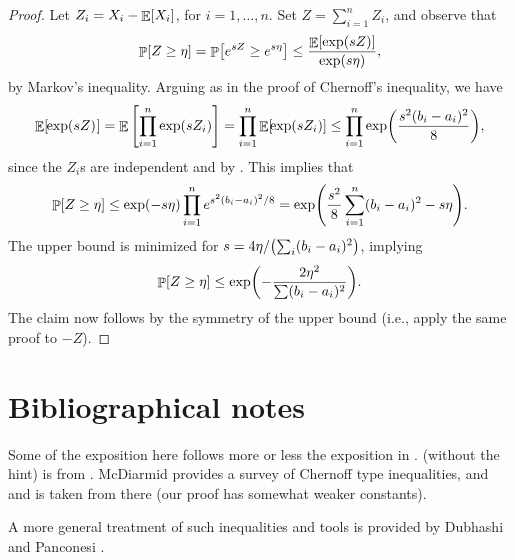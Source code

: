\begin{proof}
    Let $Z_{i}=X_{i}-\mathop{\mathbb{E}}\!\left[ {X_{i}} \right]$, for $i=1,\ldots, n$.  Set
    $Z = \sum_{i=1}^{n}Z_{i}$, and observe that
    \begin{align*}
        \Prob{ Z \geq \eta \MakesBig }  %
        =%
        \Prob{e^{sZ} \geq e^{s \eta}}
        \leq  \frac{\Ex{\exp\pth{sZ}}}{\exp(s\eta)},
    \end{align*}
    by Markov's inequality. Arguing as in the proof of Chernoff's
    inequality, we have
    \[
    \Ex{\MakeSBig\! \ts \exp\pth{sZ}\ts } = \Ex[]{ \prod_{i=1}^{n}
       \exp\pth{sZ_i}}%
    =%
    \prod_{i=1}^{n} \Ex{ \MakesBig\! \exp\pth{sZ_i}} \leq
    \prod_{i=1}^{n} \exp \pth{ \frac{s^{2}(b_{i}-a_{i})^{2}}{8}},
    \]
    since the $Z_i$s are independent and by
    . This implies that
    \begin{align*}
        \Prob{ Z \geq \eta \MakesBig } %
        \leq%
        \exp(-s\eta) \prod_{i=1}^{n} e^{s^{2}(b_{i}-a_{i})^{2}/8} %
        =%
        \exp\pth{ \frac{s^{2}}{8}\sum_{i=1}^{n}(b_{i}-a_{i})^{2} -
           s\eta }.
    \end{align*}
    The upper bound is minimized for $s = 4\eta/\pth{\sum_i
       (b_{i}-a_{i})^{2}}$, implying
    \[
    \Prob{ Z \geq \eta \MakesBig }%
    \leq%
    \exp \pth{-\frac{2\eta^{2}}{\sum (b_{i}-a_{i})^{2}}}.
    \]
    The claim now follows by the symmetry of the upper bound (i.e.,
    apply the same proof to $-Z$).
\end{proof}








\section{Bibliographical notes}

Some of the exposition here follows more or less the exposition in
\cite{mr-ra-95}.   (without the hint) is from
\cite{m-gd-99}. McDiarmid \cite{m-ombd-89} provides a survey of
Chernoff type inequalities, and  and
 is taken from there (our proof has
somewhat weaker constants).


A more general treatment of such inequalities and tools is provided by
Dubhashi and Panconesi \cite{dp-cmara-09}.


